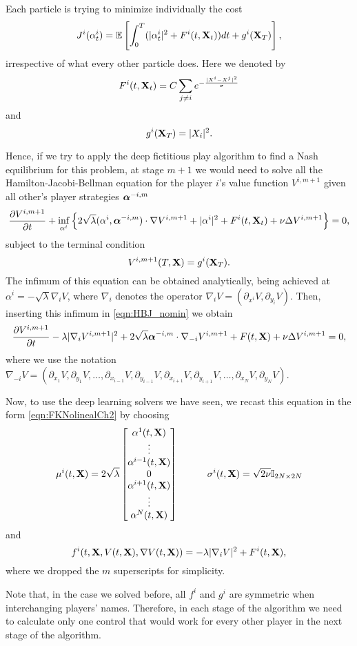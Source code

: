 Each particle is trying to minimize individually the cost 
\begin{equation}
	J^i(\alpha^i_t)=\mathbb{E}\left[\int_{0}^{T}(|\alpha^i_t|^2+F^i(t,\mathbf{X}_t)) dt +g^i(\mathbf{X}_T)\right],
\end{equation}   
irrespective of what every other particle does. Here we denoted by 
\begin{equation}
	F^i(t,\mathbf{X}_t)=C\sum_{j \neq i} e^{-\frac{|X^i-X^j|^2}{\sigma}}
\end{equation}
and 
\begin{equation}
	g^i(\mathbf{X}_T)=|X_i|^2.
\end{equation}

Hence, if we try to apply the deep fictitious play algorithm to find a Nash equilibrium for this problem, at stage $m+1$ we would need to solve all the Hamilton-Jacobi-Bellman equation for the player $i$'s value function $V^{i,m+1}$ given all other's player strategies $\bm{\alpha}^{-i,m}$
\begin{equation}
	\label{eqn:HBJ_nomin}
	\frac{\partial V^{i,m+1}}{\partial t}+\inf_{\alpha^i}\left\{2\sqrt{\lambda}(\alpha^i,\bm{\alpha}^{-i,m})\cdot \nabla V^{i,m+1} +|\alpha^i|^2+F^i(t,\mathbf{X}_t)+\nu \Delta V^{i,m+1}\right\}=0,
\end{equation}
subject to the terminal condition
\begin{equation}
	V^{i,m+1}(T,\mathbf{X})=g^i(\mathbf{X}_T).
\end{equation}
The infimum of this equation can be obtained analytically, being achieved at $\alpha^i=-\sqrt{\lambda}\nabla_i V$, where $\nabla_i$ denotes the operator $\nabla_i V=(\partial_{x^i}V,\partial_{y_i}V)$. Then, inserting this infimum in \eqref{eqn:HBJ_nomin} we obtain
\begin{equation}
	\frac{\partial V^{i,m+1}}{\partial t}-\lambda|\nabla_i V^{i,m+1}|^2+2\sqrt{\lambda}\bm{\alpha}^{-i,m}\cdot \nabla_{-i} V^{i,m+1}+F(t,\mathbf{X})+\nu\Delta V^{i,m+1}=0,
\end{equation}
where we use the notation $\nabla_{-i} V= (\partial_{x_1}V,\partial_{y_1}V,\ldots,\partial_{x_{i-1}}V,\partial_{y_{i-1}}V,\partial_{x_{i+1}}V,\partial_{y_{i+1}}V,\ldots,\partial_{x_N}V,\partial_{y_N}V)$.

Now, to use the deep learning solvers we have seen, we recast this equation in the form \eqref{eqn:FKNolinealCh2} by choosing 
\begin{equation}
	\mu^i(t,\mathbf{X})=2\sqrt{\lambda}\begin{bmatrix}
		\alpha^1(t,\mathbf{X}) \\
		\vdots\\
		\alpha^{i-1}(t,\mathbf{X}) \\
		0\\
		\alpha^{i+1}(t,\mathbf{X})\\
		\vdots   \\
		\alpha^N(t,\mathbf{X})
	\end{bmatrix}
	\quad\quad\quad
	\sigma^i(t,\mathbf{X})=\sqrt{2\nu}\mathbb{I}_{2N\times 2N}
\end{equation}
and
\begin{equation}
	f^i(t,\mathbf{X},V(t,\mathbf{X}),\nabla V(t,\mathbf{X}))=-\lambda|\nabla_i V|^2+F^i(t,\mathbf{X}),
\end{equation}
where we dropped the $m$ superscripts for simplicity.

Note that, in the case we solved before, all $f^i$ and $g^i$ are symmetric when interchanging players' names. Therefore, in each stage of the algorithm we need to calculate only one control that would work for every other player in the next stage of the algorithm.  
